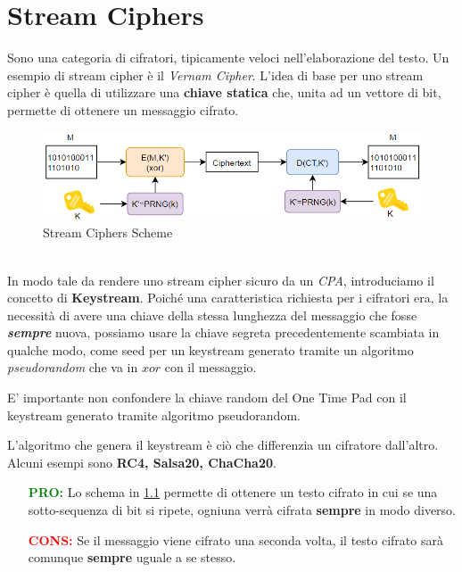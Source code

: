 \chapter{Stream Ciphers}\label{chap:streamcipher}
Sono una categoria di cifratori, tipicamente veloci nell'elaborazione del testo. Un esempio di stream cipher è il \textit{Vernam Cipher}. L'idea di base per uno stream cipher è quella di utilizzare una \textbf{chiave statica} che, unita ad un vettore di bit, permette di ottenere un messaggio cifrato.
\begin{figure}[h]
    \centering
    \includegraphics[width=\textwidth]{image/streamcipher.png}
    \caption{Stream Ciphers Scheme}
    \label{fig:stream_ciphers}
\end{figure}\\
In modo tale da rendere uno stream cipher sicuro da un \textit{CPA}, introduciamo il concetto di \textbf{Keystream}. Poiché una caratteristica richiesta per i cifratori era, la necessità di avere una chiave della stessa lunghezza del messaggio che fosse \textit{\textbf{sempre}} nuova, possiamo usare la chiave segreta precedentemente scambiata in qualche modo, come seed per un keystream generato tramite un algoritmo \textit{pseudorandom} che va in $xor$ con il messaggio.\\
\begin{remark}
E' importante non confondere la chiave random del One Time Pad con il keystream generato tramite algoritmo pseudorandom.
\end{remark}
\begin{remark}
L'algoritmo che genera il keystream è ciò che differenzia un cifratore dall'altro. Alcuni esempi sono \textbf{RC4, Salsa20, ChaCha20}.
\end{remark}
\begin{proposition}
\begin{itemize}
    \item [\textcolor{green}{\textbf{PRO:}}]Lo schema in \cref{fig:stream_ciphers} permette di ottenere un testo cifrato in cui se una sotto-sequenza di bit si ripete, ogniuna verrà cifrata \textbf{sempre} in modo diverso.
    \item [\textcolor{red}{\textbf{CONS:}}]Se il messaggio viene cifrato una seconda volta, il testo cifrato sarà comunque \textbf{sempre} uguale a se stesso.
\end{itemize}
\end{proposition}
